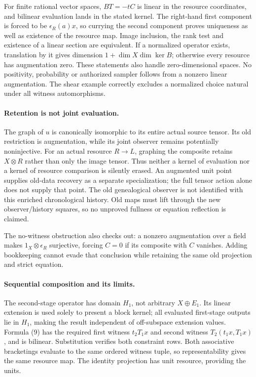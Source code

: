 \documentclass{article}
\begin{document}
For finite rational vector spaces, $BT=-tC$ is linear in the resource coordinates, and bilinear evaluation lands in the stated kernel. The right-hand first component is forced to be $\epsilon_R(a)x$, so currying the second component proves uniqueness as well as existence of the resource map. Image inclusion, the rank test and existence of a linear section are equivalent. If a normalized operator exists, translation by it gives dimension $1+\dim X\dim\ker B$; otherwise every resource has augmentation zero. These statements also handle zero-dimensional spaces. No positivity, probability or authorized sampler follows from a nonzero linear augmentation. The shear example correctly excludes a normalized choice natural under all witness automorphisms.

\paragraph{Retention is not joint evaluation.}
The graph of $u$ is canonically isomorphic to its entire actual source tensor. Its old restriction is augmentation, while its joint observer remains potentially noninjective. For an actual resource $R\to L$, graphing the composite retains $X\otimes R$ rather than only the image tensor. Thus neither a kernel of evaluation nor a kernel of resource comparison is silently erased. An augmented unit point supplies old-data recovery as a separate specialization; the full tensor action alone does not supply that point. The old genealogical observer is not identified with this enriched chronological history. Old maps must lift through the new observer/history squares, so no unproved fullness or equation reflection is claimed.

The no-witness obstruction also checks out: a nonzero augmentation over a field makes $1_X\otimes\epsilon_R$ surjective, forcing $C=0$ if its composite with $C$ vanishes. Adding bookkeeping cannot evade that conclusion while retaining the same old projection and strict equation.

\paragraph{Sequential composition and its limits.}
The second-stage operator has domain $H_1$, not arbitrary $X\oplus E_1$. Its linear extension is used solely to present a block kernel; all evaluated first-stage outputs lie in $H_1$, making the result independent of off-subspace extension values. Formula (9) has the required first witness $t_2T_1x$ and second witness $T_2(t_1x,T_1x)$, and is bilinear. Substitution verifies both constraint rows. Both associative bracketings evaluate to the same ordered witness tuple, so representability gives the same resource map. The identity projection has unit resource, providing the units.
\end{document}
